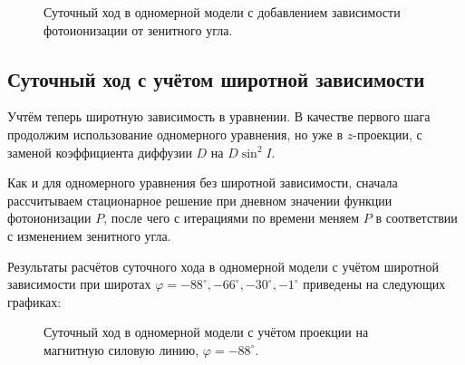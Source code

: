 \documentclass[14pt, a4paper, fleqn]{extarticle}
\begin{document}
\begin{figure}[H]
\caption{Суточный ход в одномерной модели с добавлением зависимости фотоионизации от зенитного угла.}
\end{figure}

\subsection{Суточный ход с учётом широтной зависимости}


Учтём теперь широтную зависимость в уравнении. В качестве первого шага продолжим использование одномерного уравнения, но уже в $z$-проекции, с заменой коэффициента диффузии $D$ на $D\sin^2I$.

Как и для одномерного уравнения без широтной зависимости, сначала рассчитываем стационарное решение при дневном значении функции фотоионизации $P$, после чего с итерациями по времени меняем $P$ в соответствии с изменением зенитного угла.

Результаты расчётов суточного хода в одномерной модели с учётом широтной зависимости при широтах $\varphi = -88^\circ, -66^\circ, -30^\circ, -1^\circ$ приведены на следующих графиках:

\begin{figure}[H]
\caption{Суточный ход в одномерной модели с учётом проекции на магнитную силовую линию, $\varphi = -88^\circ$.}
\end{figure}
\end{document}
